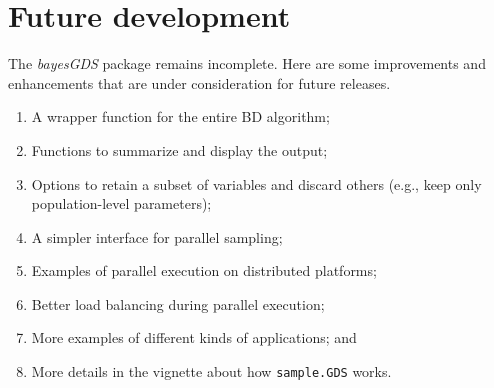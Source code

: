 \documentclass[10pt]{article}\usepackage[]{graphicx}\usepackage[]{color}
\newcommand{\pkg}[1]{\emph{#1}}
\newcommand{\func}[1]{\texttt{#1}}
\begin{document}
\section{Future development}

The \pkg{bayesGDS} package remains incomplete.  Here are some
improvements and enhancements that are under consideration for future releases.

\begin{enumerate}
\item A wrapper function for the entire BD algorithm;
\item Functions to summarize and display the output;
\item Options to retain a subset of variables and discard others
  (e.g., keep only population-level parameters);
\item A simpler interface for parallel sampling;
  \item Examples of parallel execution on distributed platforms;
  \item Better load balancing during parallel execution;
\item More examples of different kinds of applications; and
  \item More details in the vignette about how \func{sample.GDS} works.
\end{enumerate}



\printbibliography
\end{document}
